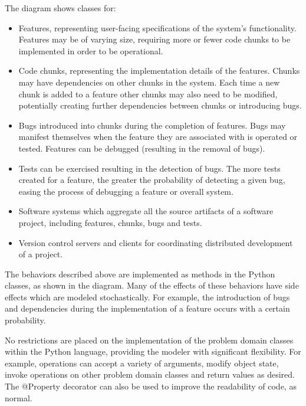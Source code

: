 \documentclass{llncs}
\begin{document}
The diagram shows classes for:

\begin{itemize}
\item Features, representing user-facing specifications of the system's functionality.  Features may be of varying size,
  requiring more or fewer code chunks to be implemented in order to be operational.

\item Code chunks, representing the implementation details of the features. Chunks may have dependencies on other chunks
  in the system.  Each time a new chunk is added to a feature other chunks may also need to be modified, potentially
  creating further dependencies between chunks or introducing bugs.

\item Bugs introduced into chunks during the completion of features.  Bugs may manifest themselves when the feature they
  are associated with is operated or tested.  Features can be debugged (resulting in the removal of bugs).

\item Tests can be exercised resulting in the detection of bugs.  The more tests created for a feature, the greater the
  probability of detecting a given bug, easing the process of debugging a feature or overall system.

\item Software systems which aggregate all the source artifacts of a software project, including features, chunks, bugs
  and tests.

\item Version control servers and clients for coordinating distributed development of a project.
\end{itemize}

The behaviors described above are implemented as methods in the Python classes, as shown in the diagram.  Many of the
effects of these behaviors have side effects which are modeled stochastically. For example, the introduction of bugs and
dependencies during the implementation of a feature occurs with a certain probability.

No restrictions are placed on the implementation of the problem domain classes within the Python language, providing the
modeler with significant flexibility.  For example, operations can accept a variety of arguments, modify object state,
invoke operations on other problem domain classes and return values as desired. The @Property decorator can also be used
to improve the readability of code, as normal.
\end{document}
